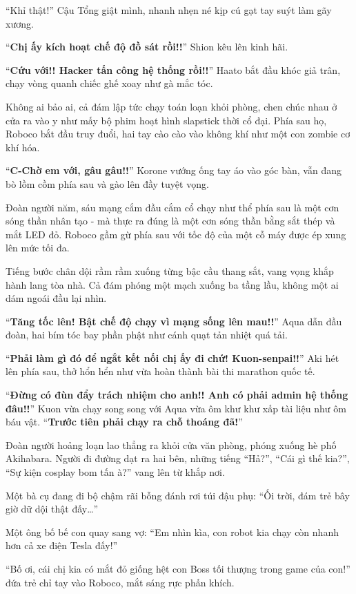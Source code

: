\documentclass[../main.tex]{subfiles}
\begin{document}
``Khỉ thật!'' Cậu Tổng giật mình, nhanh nhẹn né kịp cú gạt tay suýt làm gãy xương.

``\textbf{Chị ấy kích hoạt chế độ đồ sát rồi!!}'' Shion kêu lên kinh hãi.

``\textbf{Cứu với!! Hacker tấn công hệ thống rồi!!}'' Haato bắt đầu khóc giả trân, chạy vòng quanh chiếc ghế xoay như gà mắc tóc.

Không ai bảo ai, cả đám lập tức chạy toán loạn khỏi phòng, chen chúc nhau ở cửa ra vào y như mấy bộ phim hoạt hình slapstick thời cổ đại. Phía sau họ, Roboco bắt đầu truy đuổi, hai tay cào cào vào không khí như một con zombie cơ khí hóa.

``\textbf{C-Chờ em với, gâu gâu!!}'' Korone vướng ống tay áo vào góc bàn, vẫn đang bò lồm cồm phía sau và gào lên đầy tuyệt vọng.

Đoàn người năm, sáu mạng cắm đầu cắm cổ chạy như thể phía sau là một cơn sóng thần nhân tạo - mà thực ra đúng là một cơn sóng thần bằng sắt thép và mắt LED đỏ. Roboco gầm gừ phía sau với tốc độ của một cỗ máy được ép xung lên mức tối đa.

Tiếng bước chân dội rầm rầm xuống từng bậc cầu thang sắt, vang vọng khắp hành lang tòa nhà. Cả đám phóng một mạch xuống ba tầng lầu, không một ai dám ngoái đầu lại nhìn.

``\textbf{Tăng tốc lên! Bật chế độ chạy vì mạng sống lên mau!!}'' Aqua dẫn đầu đoàn, hai bím tóc bay phần phật như cánh quạt tản nhiệt quá tải.

``\textbf{Phải làm gì đó để ngắt kết nối chị ấy đi chứ! Kuon-senpai!!}'' Aki hét lên phía sau, thở hổn hển như vừa hoàn thành bài thi marathon quốc tế.

``\textbf{Đừng có đùn đẩy trách nhiệm cho anh!! Anh có phải admin hệ thống đâu!!}'' Kuon vừa chạy song song với Aqua vừa ôm khư khư xấp tài liệu như ôm báu vật. ``\textbf{Trước tiên phải chạy ra chỗ thoáng đã!}''

Đoàn người hoảng loạn lao thẳng ra khỏi cửa văn phòng, phóng xuống hè phố Akihabara. Người đi đường dạt ra hai bên, những tiếng ``Hả?'', ``Cái gì thế kia?'', ``Sự kiện cosplay bom tấn à?'' vang lên từ khắp nơi.

Một bà cụ đang đi bộ chậm rãi bỗng đánh rơi túi đậu phụ: ``Ối trời, đám trẻ bây giờ dữ dội thật đấy\dots''

Một ông bố bế con quay sang vợ: ``Em nhìn kìa, con robot kia chạy còn nhanh hơn cả xe điện Tesla đấy!''

``Bố ơi, cái chị kia có mắt đỏ giống hệt con Boss tối thượng trong game của con!'' đứa trẻ chỉ tay vào Roboco, mắt sáng rực phấn khích.
\end{document}

